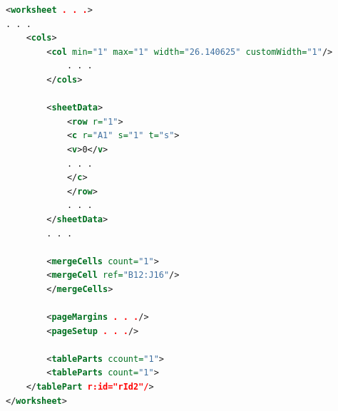 \documentclass[14pt]{matmex-diploma}
\begin{document}
\begin{lstlisting}[language=XML, caption={Пример файла worksheet.xml},captionpos=b, label=list2]
<worksheet . . .>
. . .
    <cols>
        <col min="1" max="1" width="26.140625" customWidth="1"/>
            . . .
        </cols>
        
        <sheetData>
            <row r="1">
            <c r="A1" s="1" t="s">
            <v>0</v>
            . . .
            </c>
            </row>
            . . .
        </sheetData>
        . . .
        
        <mergeCells count="1">
        <mergeCell ref="B12:J16"/>
        </mergeCells>
        
        <pageMargins . . ./>
        <pageSetup . . ./>
        
        <tableParts ccount="1">
        <tableParts count="1">
    </tablePart r:id="rId2"/>
</worksheet>
\end{lstlisting}

\setmonofont[Mapping=tex-text]{CMU Typewriter Text}


\end{document}
